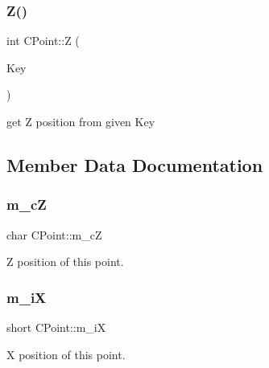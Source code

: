 \subsubsection{\texorpdfstring{Z()}{Z()}\hspace{0.1cm}{\footnotesize\ttfamily [2/2]}}
{\footnotesize\ttfamily int C\+Point\+::Z (\begin{DoxyParamCaption}\item[{\mbox{\hyperlink{res2dmp_8cpp_a8ae9d53f33f46cfcfcb9736e6351452a}{K\+EY}}}]{Key }\end{DoxyParamCaption})\hspace{0.3cm}{\ttfamily [static]}}



get Z position from given Key 



\subsection{Member Data Documentation}
\mbox{\label{classCPoint_af5bd6bd96c41a2f050fe2f5f2d6595de}} 
\subsubsection{\texorpdfstring{m\_cZ}{m\_cZ}}
{\footnotesize\ttfamily char C\+Point\+::m\+\_\+cZ\hspace{0.3cm}{\ttfamily [protected]}}



Z position of this point. 

\mbox{\label{classCPoint_ac9057a0b88c5ef9904b6b1e0f8f6ef33}} 
\subsubsection{\texorpdfstring{m\_iX}{m\_iX}}
{\footnotesize\ttfamily short C\+Point\+::m\+\_\+iX\hspace{0.3cm}{\ttfamily [protected]}}



X position of this point. 

\mbox{\label{classCPoint_a9b44115b3f3268f92c695e58bf8f910d}} 
